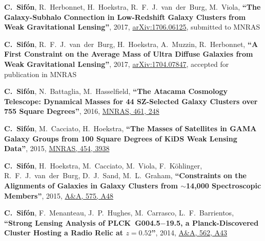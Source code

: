 \documentclass{article}
\def\myself{\textbf{\color{red} C.~Sif\'on}}
\def\aap{A\&A}
\def\mnras{MNRAS}
\newcommand{\accepted}[1]{accepted for publication in #1}
\newcommand{\submitted}[1]{submitted to #1}
\newcommand{\paper}[1]{\textbf{``#1''}}
\begin{document}
\vspace{-0.5cm}
\begin{etaremune}

\item
\myself, R.~Herbonnet, H.~Hoekstra, R.~F.~J.~van~der~Burg, M.~Viola,
\paper{The Galaxy-Subhalo Connection in Low-Redshift Galaxy Clusters from
Weak Gravitational Lensing},
2017, \href{http://adsabs.harvard.edu/abs/2017arXiv170606125S}{arXiv:1706.06125},
\submitted{\mnras}

\item
\myself, R.~F.~J.~van~der~Burg, H.~Hoekstra, A.~Muzzin, R.~Herbonnet,
\paper{A First Constraint on the Average Mass of Ultra Diffuse Galaxies from 
Weak Gravitational Lensing},
2017, \href{http://adsabs.harvard.edu/abs/2017arXiv170407847S}{arXiv:1704.07847},
\accepted{\mnras}

\item 
\myself, N.~Battaglia, M.~Hasselfield, 
\paper{The Atacama Cosmology Telescope: Dynamical Masses for 44 SZ-Selected Galaxy Clusters over 
755 Square Degrees},
2016, \href{http://adsabs.harvard.edu/abs/2016MNRAS.461..248S}{\mnras, 461, 248} 

\item
\myself, M.~Cacciato, H.~Hoekstra, 
\paper{The Masses of Satellites in GAMA Galaxy Groups from 100 Square Degrees of KiDS Weak Lensing 
Data},
2015, \href{https://adsabs.harvard.edu/abs/2015MNRAS.454.3938S}{\mnras, 454, 3938}

\item
\myself, H.~Hoekstra, M.~Cacciato, M.~Viola, F.~K\"ohlinger, R.~F.~J.~van~der~Burg, D.~J.~Sand, 
M.~L.~Graham,
\paper{Constraints on the Alignments of Galaxies in Galaxy Clusters from $\sim$14,000 Spectroscopic 
Members},
2015, \href{https://adsabs.harvard.edu/abs/2015A&A...575A..48S}{\aap, 575, A48}

\item
\myself, F.~Menanteau, J.~P.~Hughes, M.~Carrasco, L.~F.~Barrientos,
\paper{Strong Lensing Analysis of PLCK~G004.5$-$19.5, a Planck-Discovered Cluster Hosting a Radio 
Relic at $z=0.52$},
2014, \href{https://adsabs.harvard.edu/abs/2014A&A...562A..43S}{\aap, 562, A43}


\end{etaremune}
\end{document}
